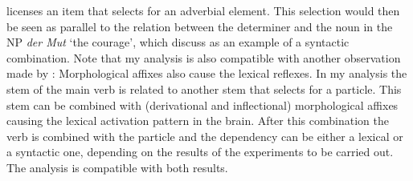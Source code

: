 \begin{exe}
\begin{xlist}[iv.]
\begin{exe}
\begin{xlist}[iv.]
licenses an item that selects for an adverbial element. This selection would then be seen as
parallel to the relation between the determiner and the noun in the NP \emph{der Mut} `the
courage', which \citet[]{CSP2010a} discuss as an example of a syntactic combination. Note
that my analysis is also compatible with another observation made by \citet*{SPP2005a-u}:
Morphological affixes also cause the lexical reflexes. In my analysis the stem of the main
verb is related to another stem that selects for a particle. This stem can be combined with
(derivational and inflectional) morphological affixes causing the lexical activation pattern in the
brain. After this combination the verb is combined with the particle and the dependency can be
either a lexical or a syntactic one, depending on the results of the experiments to be carried
out. The analysis is compatible with both results.


\end{xlist}
\end{exe}
\end{xlist}
\end{exe}
